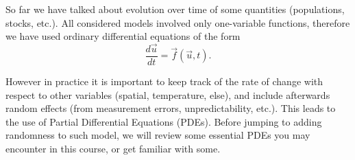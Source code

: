 So far we have talked about evolution over time of some quantities (populations, stocks, etc.). All considered models involved only one-variable functions, therefore we have used ordinary differential equations of the form 
\[\displaystyle \frac{d \vec{u}}{dt} = \vec{f}(\vec{u},t).\]

However in practice it is important to keep track of the rate of change with respect to other variables (spatial, temperature, else), and include afterwards random effects (from measurement errors, unpredictability, etc.). This leads to the use of Partial Differential Equations (PDEs). Before jumping to adding randomness to such model, we will review some essential PDEs you may encounter in this course, or get familiar with some. 

